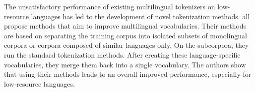 The unsatisfactory performance of existing multilingual tokenizers on low-resource languages has led to the development of novel tokenization methods. \citet{chung_improving_2020,zheng_allocating_2021,liang_xlm-v_2023} all propose methods that aim to improve multilingual vocabularies. Their methods are based on separating the training corpus into isolated subsets of monolingual corpora or corpora composed of similar languages only. On the subcorpora, they run the standard tokenization methods. After creating these language-specific vocabularies, they merge them back into a single vocabulary. The authors show that using their methods leads to an overall improved performance, especially for low-resource languages.







